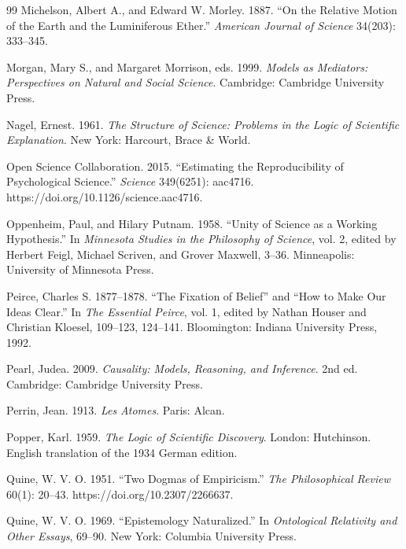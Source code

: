 \begin{thebibliography}{99}
Michelson, Albert A., and Edward W. Morley. 1887. \enquote{On the Relative Motion of the Earth and the Luminiferous Ether.} \emph{American Journal of Science} 34(203): 333--345.

Morgan, Mary S., and Margaret Morrison, eds. 1999. \emph{Models as Mediators: Perspectives on Natural and Social Science}. Cambridge: Cambridge University Press.

Nagel, Ernest. 1961. \emph{The Structure of Science: Problems in the Logic of Scientific Explanation}. New York: Harcourt, Brace \& World.

Open Science Collaboration. 2015. \enquote{Estimating the Reproducibility of Psychological Science.} \emph{Science} 349(6251): aac4716. https://doi.org/10.1126/science.aac4716.

Oppenheim, Paul, and Hilary Putnam. 1958. \enquote{Unity of Science as a Working Hypothesis.} In \emph{Minnesota Studies in the Philosophy of Science}, vol. 2, edited by Herbert Feigl, Michael Scriven, and Grover Maxwell, 3--36. Minneapolis: University of Minnesota Press.

Peirce, Charles S. 1877--1878. \enquote{The Fixation of Belief} and \enquote{How to Make Our Ideas Clear.} In \emph{The Essential Peirce}, vol. 1, edited by Nathan Houser and Christian Kloesel, 109--123, 124--141. Bloomington: Indiana University Press, 1992.

Pearl, Judea. 2009. \emph{Causality: Models, Reasoning, and Inference}. 2nd ed. Cambridge: Cambridge University Press.

Perrin, Jean. 1913. \emph{Les Atomes}. Paris: Alcan.

Popper, Karl. 1959. \emph{The Logic of Scientific Discovery}. London: Hutchinson. English translation of the 1934 German edition.

Quine, W. V. O. 1951. \enquote{Two Dogmas of Empiricism.} \emph{The Philosophical Review} 60(1): 20--43. https://doi.org/10.2307/2266637.

Quine, W. V. O. 1969. \enquote{Epistemology Naturalized.} In \emph{Ontological Relativity and Other Essays}, 69--90. New York: Columbia University Press.


\end{thebibliography}
